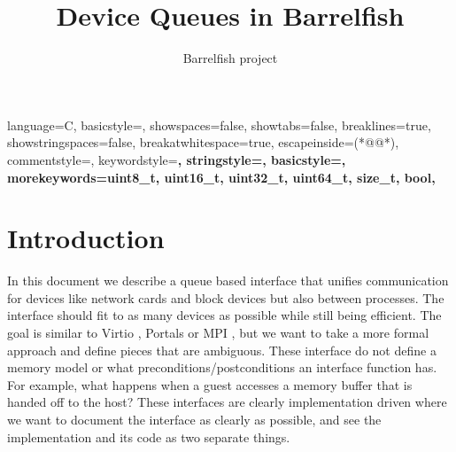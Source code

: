 \documentclass[a4paper,11pt,twoside]{report}
\title{Device Queues in Barrelfish}
\author{Barrelfish project}
\begin{document}
	\maketitle			%
	
	\begin{versionhistory}
	\end{versionhistory}
	
	\tableofcontents		%
	\cleardoublepage
	\setcounter{secnumdepth}{2}

	\newcommand{\todo}[1]{[\textcolor{red}{\emph{#1}}]}

	\newcommand{\virtio}{Virtio }
	\newcommand{\devif}{Devif }
	\newcommand{\ep}[1]{$Ep_{#1}$}

\usepackage{color}

{language=C,
	basicstyle=\tiny,
	showspaces=false,
	showtabs=false,
	breaklines=true,
	showstringspaces=false,
	breakatwhitespace=true,
	escapeinside={(*@}{@*)},
	commentstyle=\color{greencomments},
	keywordstyle=\color{bluekeywords}\bfseries,
	stringstyle=\color{redstrings},
	basicstyle=\ttfamily,
	morekeywords={uint8_t, uint16_t, uint32_t, uint64_t, size_t, bool},}
	
	
	
	
	\chapter{Introduction}
	In this document we describe a queue based interface that unifies communication for 
	devices like network cards and block devices but also between processes. 
	The interface should fit to as many devices as possible while still being efficient.
	The goal is similar to \virtio \cite{virtio:sigops}, Portals \cite{portals} or MPI \cite{mpi}, 
	but we want to take a more formal 
	approach and define pieces that are ambiguous. These interface do not define a memory model 
	or what preconditions/postconditions an interface function has. 
	For example, what happens when a guest accesses a memory buffer that is handed off 
	to the host? These interfaces are clearly implementation driven where 
	we want to document the interface as clearly as possible, and see the implementation and
	its code as two separate things.
	
\end{document}
